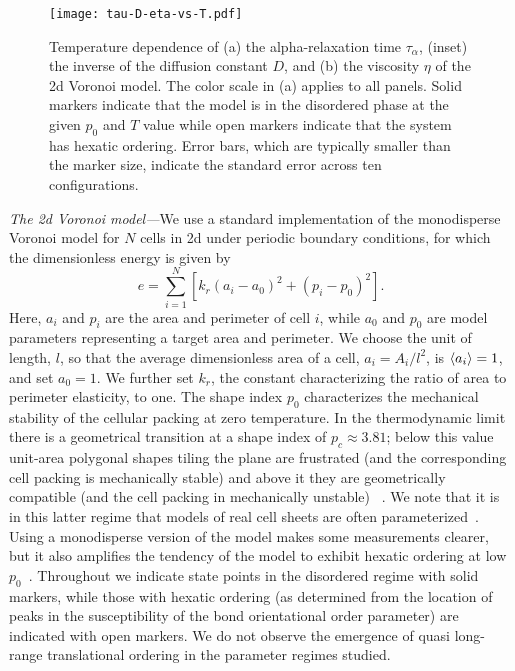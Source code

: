 \documentclass[amsmath,amssymb,prl,reprint,twocolumn]{revtex4-2}
\begin{document}
\begin{figure}[t]
\centering
\texttt{[image: tau-D-eta-vs-T.pdf]}
\vspace{-1.5\intextsep}
\caption{Temperature dependence of (a) the alpha-relaxation time $\tau_{\alpha}$, (inset) the inverse of the diffusion constant $D$, and (b) the viscosity $\eta$ of the 2d Voronoi model. 
The color scale in (a) applies to all panels. 
Solid markers indicate that the model is in the disordered phase at the given $p_0$ and $T$ value while open markers indicate that the system has hexatic ordering. Error bars, which are typically smaller than the marker size, indicate the standard error across ten configurations.
}
\label{fig:T-dependence}
\end{figure}


\emph{The 2d Voronoi model---}We use a standard implementation of the monodisperse Voronoi model for $N$ cells in 2d under periodic boundary conditions, for which the dimensionless energy is given by~\cite{Farhadifar2007,Bi2015,Bi2016}
\begin{equation}
e =  \sum_{i=1}^N \left[k_r (a_i - a_{0})^2 + (p_i - p_{0})^2\right].
\end{equation}
Here, $a_i$ and $p_i$ are the area and perimeter of cell $i$, while $a_{0}$ and $p_{0}$ are model parameters representing a target area and perimeter. 
We choose the unit of length, $l$, so that the average dimensionless area of a cell, $a_i = A_i/l^2$, is $\expval{a_i}=1$, and set $a_0=1$. We further set $k_r$, the constant characterizing the ratio of area to perimeter elasticity, to one.
The shape index $p_0$ characterizes the mechanical stability of the cellular packing at zero temperature.
In the thermodynamic limit there is a geometrical transition at a shape index of $p_c \approx 3.81$; below this value unit-area polygonal shapes tiling the plane are frustrated (and the corresponding cell packing is mechanically stable) and above it they are geometrically compatible (and the cell packing in mechanically unstable) ~\cite{Bi2015,Li2018,Urbani2023,Sussman2018SM}.
We note that it is in this latter regime that models of real cell sheets are often parameterized~\cite{Devany2021,Armengol2023,Chisolm2024}.
Using a monodisperse version of the model makes some measurements clearer, but it also amplifies the tendency of the model to exhibit hexatic ordering at low $p_0$~\cite{Li2018}.
Throughout we indicate state points in the disordered regime with solid markers, while those with hexatic ordering (as determined from the location of peaks in the susceptibility of the bond orientational order parameter) are indicated with open markers.
We do not observe the emergence of quasi long-range translational ordering in the parameter regimes studied.
\end{document}
